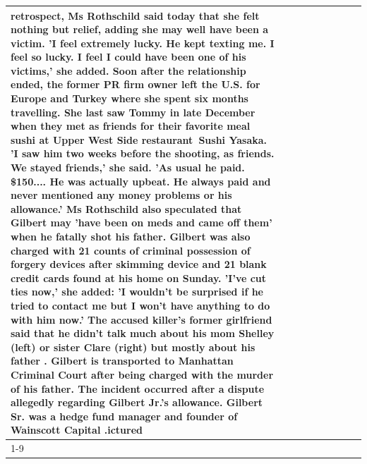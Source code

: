 \begin{table}[H]
\begin{tabular}{lllrlllll}
retrospect, Ms Rothschild said today that she felt nothing but relief, adding she may well have been a victim. 'I feel extremely lucky. He kept texting me. I feel so lucky. I feel I could have been one of his victims,' she added. Soon after the relationship ended, the former PR firm owner left the U.S. for Europe and Turkey where she spent six months  travelling. She last saw Tommy in late December when they met as friends for their favorite meal sushi at Upper West Side restaurant Sushi Yasaka. 'I saw him two weeks before the shooting, as friends. We stayed friends,' she said. 'As usual he paid. \$150.... He was actually upbeat. He always paid and never mentioned any money problems or his allowance.' Ms Rothschild also speculated that Gilbert may 'have been on meds and came off them' when he fatally shot his father. Gilbert was also charged with 21 counts of criminal possession of forgery devices after skimming device and 21 blank credit cards found at his home on Sunday. 'I've cut ties now,' she added: 'I wouldn’t be surprised if he tried to contact me but I won’t have anything to do with him now.' The accused killer's former girlfriend said that he didn't talk much about his mom Shelley (left) or sister Clare (right) but mostly about his father . Gilbert is transported to Manhattan Criminal Court  after being charged with the murder of his father. The incident occurred after a dispute allegedly regarding Gilbert Jr.'s allowance. Gilbert Sr. was a hedge fund manager and founder of Wainscott Capital .ictured \\
\cline{1-9}

\end{tabular}
\end{table}
